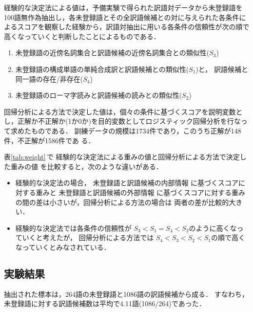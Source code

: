 経験的な決定法による値は，予備実験で得られた訳語対データから未登録語を
100語無作為抽出し，各未登録語とその全訳語候補との対に与えられた各条件に
よるスコアを観察した経験から，訳語対抽出に用いる各条件の信頼性が次の順で
高くなっていくと判断したことによるものである．
\begin{enumerate}
\item 未登録語の近傍名詞集合と訳語候補の近傍名詞集合との類似性($S_3$)
\item 未登録語の構成単語の単純合成訳と訳語候補との類似性($S_1$)と，
訳語候補と同一語の存在/非存在($S_4$)
\item 未登録語のローマ字読みと訳語候補の読みとの類似性($S_2$)
\end{enumerate}

回帰分析による方法で決定した値は，個々の条件に基づくスコアを説明変数と
し，正解か不正解か(1か0か)を目的変数としてロジスティック回帰分析を行なっ
て求めたものである．
訓練データの規模は1734件であり，このうち正解が148件，不正解が1586件であ
る．

表\ref{tab:weight}\,で
経験的な決定法による重みの値と回帰分析による方法で決定した重みの値
を比較すると，次のような違いがある．
\begin{itemize}
\item 経験的な決定法の場合，
未登録語と訳語候補の内部情報
に基づくスコアに対する重みと
未登録語と訳語候補の外部情報
に基づくスコアに対する重みの間の差は小さいが，回帰分析による方法の場合は
両者の差が比較的大きい． 
\item 経験的な決定法では各条件の信頼性が
$S_3$$< $$S_1$$=$$S_4$$<$$S_2$のように高くなっていくと考えたが，
回帰分析による方法では
$S_4$$<$$S_3$$<$$S_2$$<$$S_1$の順で高くなっていくとみなされている．
\end{itemize}


\subsection{実験結果}
\label{sec:experiment:result}

抽出された標本は，264語の未登録語と1086語の訳語候補から成る．
すなわち，未登録語に対する訳語候補数は平均で4.11語(1086/264)であった．

